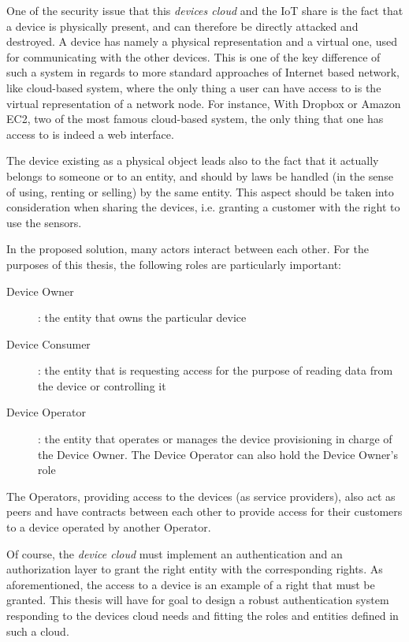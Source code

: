 One of the security issue that this \emph{devices cloud} and the IoT share is the fact that a device is physically present, and can therefore be directly attacked and destroyed. A device has namely a physical representation and a virtual one, used for communicating with the other devices. This is one of the key difference of such a system in regards to more standard approaches of Internet based network, like cloud-based system, where the only thing a user can have access to is the virtual representation of a network node. For instance, With Dropbox or Amazon EC2, two of the most famous cloud-based system, the only thing that one has access to is indeed a web interface.

The device existing as a physical object leads also to the fact that it actually belongs to someone or to an entity, and should by laws be handled (in the sense of using, renting or selling) by the same entity. This aspect should be taken into consideration when sharing the devices, i.e. granting a customer with the right to use the sensors.

In the proposed solution, many actors interact between each other. For the purposes of this thesis, the following roles are particularly important:

\begin{description}
	\item[Device Owner]: the entity that owns the particular device
	\item[Device Consumer]: the entity that is requesting access for the purpose of reading data from the device or controlling it
	\item[Device Operator]: the entity that operates or manages the device provisioning in charge of the Device Owner. The Device Operator can also hold the Device Owner's role
\end{description}

The Operators, providing access to the devices (as service providers), also act as peers and have contracts between each other to provide access for their customers to a device operated by another Operator.

Of course, the \emph{device cloud} must implement an authentication and an authorization layer to grant the right entity with the corresponding rights. As aforementioned, the access to a device is an example of a right that must be granted. This thesis will have for goal to design a robust authentication system responding to the devices cloud needs and fitting the roles and entities defined in such a cloud. 


